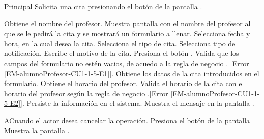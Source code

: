 \begin{UCtrayectoria}{Principal}
	\UCpaso[\UCactor] Solicita una cita presionando el botón  de la pantalla .

	\UCpaso Obtiene el nombre del profesor.
	\UCpaso Muestra pantalla  con el nombre del profesor al que se le pedirá la cita y se mostrará un formulario a llenar. \label{error}
	\UCpaso [\UCactor] Selecciona fecha y hora, en la cual desea la cita.
	\UCpaso  [\UCactor] Selecciona el tipo de cita.
	\UCpaso  [\UCactor] Selecciona tipo de notificación.
	\UCpaso  [\UCactor] Escribe el motivo de la cita.
	\UCpaso  [\UCactor] Presiona el botón .
	\UCpaso Valida que los campos del formulario no estén vacios, de acuedo a la regla de negocio . [Error \ref{EM-alumnoProfesor-CU1-1-5-E1}]. 
		\UCpaso Obtiene los datos de la cita introducidos en el formulario. 
		\UCpaso Obtiene el horario del profesor.
		\UCpaso Valida el horario de la cita con el horario del profesor según la regla de negocio .[Error \ref{EM-alumnoProfesor-CU1-1-5-E2}].
		\UCpaso Persiste la información en el sistema.
	\UCpaso Muestra el mensaje  en la pantalla .



\end{UCtrayectoria}
		

\begin{UCtrayectoriaA}{A}{Cuando el actor desea cancelar la operación.}
	\UCpaso [\UCactor] Presiona el botón  de la pantalla 
	\UCpaso Muestra la pantalla .
\end{UCtrayectoriaA}


